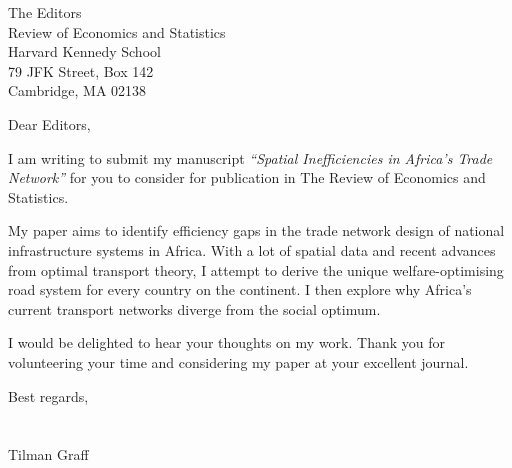 \documentclass{letter}
\begin{document}
\begin{letter}{The Editors \\ Review of Economics and Statistics \\ Harvard Kennedy School \\ 79 JFK Street, Box 142 \\Cambridge, MA 02138}
\opening{Dear Editors,}

I am writing to submit my manuscript \emph{``Spatial Inefficiencies in Africa's Trade Network''} for you to consider for publication in The Review of Economics and Statistics.

My paper aims to identify efficiency gaps in the trade network design of national infrastructure systems in Africa. With a lot of spatial data and recent advances from optimal transport theory, I attempt to derive the unique welfare-optimising road system for every country on the continent. I then explore why Africa's current transport networks diverge from the social optimum.

I would be delighted to hear your thoughts on my work. Thank you for volunteering your time and considering my paper at your excellent journal.

Best regards,
\\
\\
\\
Tilman Graff

\end{letter}
\end{document}
